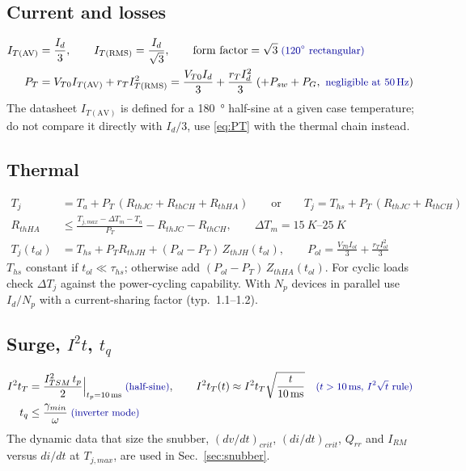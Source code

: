 \documentclass[10pt,a4paper]{scrartcl}
\newcommand{\Id}{I_{d}}
\newcommand{\ITav}{I_{T\mathrm{(AV)}}}
\newcommand{\ITrms}{I_{T\mathrm{(RMS)}}}
\newcommand{\ITSM}{I_{TSM}}
\newcommand{\iit}{I^{2}t}
\newcommand{\Tj}{T_{j}}
\newcommand{\rt}[1]{\text{\small\color{blue!60!black} #1}}
\begin{document}
\subsection{Current and losses}
\begin{align}
\ITav &= \frac{\Id}{3}, \qquad
\ITrms = \frac{\Id}{\sqrt3}, \qquad
\text{form factor} = \sqrt3 \;\rt{(\SI{120}{\degree} rectangular)} \label{eq:IT}\\
P_T &= V_{T0}\ITav + r_T\ITrms^2 = \frac{V_{T0}\Id}{3} + \frac{r_T\Id^2}{3} \;(+P_{sw}+P_G,\ \rt{negligible at \SI{50}{Hz}}) \label{eq:PT}
\end{align}
The datasheet $\ITav$ is defined for a \SI{180}{\degree} half-sine at a given case temperature; do not compare it directly with $\Id/3$, use \eqref{eq:PT} with the thermal chain instead.

\subsection{Thermal}
\begin{align}
\Tj &= T_a + P_T\,(R_{thJC} + R_{thCH} + R_{thHA}) \qquad\text{or}\qquad \Tj = T_{hs} + P_T\,(R_{thJC}+R_{thCH}) \label{eq:Tj}\\
R_{thHA} &\le \frac{T_{j,max} - \Delta T_m - T_a}{P_T} - R_{thJC} - R_{thCH}, \qquad \Delta T_m = \SIrange{15}{25}{K} \label{eq:Rth}\\
\Tj(t_{ol}) &= T_{hs} + P_T R_{thJH} + (P_{ol} - P_T)\,Z_{thJH}(t_{ol}), \qquad P_{ol} = \frac{V_{T0}I_{ol}}{3} + \frac{r_T I_{ol}^2}{3} \label{eq:Tjol}
\end{align}
$T_{hs}$ constant if $t_{ol}\ll\tau_{hs}$; otherwise add $(P_{ol}-P_T)\,Z_{thHA}(t_{ol})$. For cyclic loads check $\Delta\Tj$ against the power-cycling capability. With $N_p$ devices in parallel use $\Id/N_p$ with a current-sharing factor (typ.\ 1.1--1.2).

\subsection{\texorpdfstring{Surge, $\iit$, $t_q$}{Surge, I2t, tq}}
\begin{align}
\iit_T &= \frac{\ITSM^2\,t_p}{2}\Big|_{t_p=\SI{10}{ms}} \;\rt{(half-sine)}, \qquad
\iit_T(t) \approx \iit_T\sqrt{\frac{t}{\SI{10}{ms}}} \quad \rt{($t > \SI{10}{ms}$, $I^2\sqrt t$ rule)} \label{eq:i2tT}\\
t_q &\le \frac{\gamma_{min}}{\omega} \;\rt{(inverter mode)}
\end{align}
The dynamic data that size the snubber, $(dv/dt)_{crit}$, $(di/dt)_{crit}$, $Q_{rr}$ and $I_{RM}$ versus $di/dt$ at $T_{j,max}$, are used in Sec.~\ref{sec:snubber}.
\end{document}

